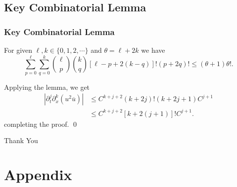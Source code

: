 \documentclass{beamer}
\numberwithin{equation}{section}
\begin{document}
\subsection{Key Combinatorial Lemma}
\begin{frame}
  \frametitle{Key Combinatorial Lemma}
  \begin{lemma}
For given $\ell, k\in \{0,1,2,\cdots\}$ and  $\theta=\ell+ 2k$ we have
%
\begin{equation*}
\label{key-in} \sum_{p=0}^{\ell}
\sum_{q=0}^{k}\binom{\ell}{p}\binom{k}{q}[\ell-p+2(k-q)]!
(p+2 q)!\le (\theta+1)\theta!.
\end{equation*}
%
\end{lemma}
\end{frame}
%
%
\begin{frame}
Applying the lemma, we get 
\begin{equation*}
\label{meq7}
\begin{split}
\left \vert \partial_t^j\partial_x^k (u^2\overline{u})\right \vert
&\le C^{k+j + 2}(k+2j)!
(k+2j+1)C^{j+1}\\
&\le C^{k+j+2}[k+2(j+1)]! C^{j+1}.
\end{split}
\end{equation*}
%
completing the proof. \qed
\end{frame}
\begin{frame}
  \centerline{\Huge Thank You}
\end{frame}
\section{Appendix}
\end{document}
